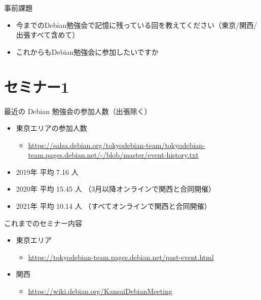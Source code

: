 \begin{frame}{事前課題}
  \begin{itemize}
  \item 今までのDebian勉強会で記憶に残っている回を教えてください（東京/関西/出張すべて含めて）
  \item これからもDebian勉強会に参加したいですか
  \end{itemize}
\end{frame}

{\footnotesize
  
}

%

\section{セミナー1}

\begin{frame}{最近の Debian 勉強会の参加人数（出張除く）}
  \begin{itemize}
  \item 東京エリアの参加人数
    \begin{itemize}
    \item \url{https://salsa.debian.org/tokyodebian-team/tokyodebian-team.pages.debian.net/-/blob/master/event-history.txt}
    \end{itemize}
  \item 2019年 平均  7.16 人
  \item 2020年 平均 15.45 人 （3月以降オンラインで関西と合同開催）
  \item 2021年 平均 10.14 人 （すべてオンラインで関西と合同開催）
  \end{itemize}
\end{frame}

\begin{frame}{これまでのセミナー内容}
  \begin{itemize}
  \item 東京エリア
    \begin{itemize}
    \item \url{https://tokyodebian-team.pages.debian.net/past-event.html}
    \end{itemize}
  \item 関西
    \begin{itemize}
    \item \url{https://wiki.debian.org/KansaiDebianMeeting}
    \end{itemize}
  \end{itemize}
\end{frame}

